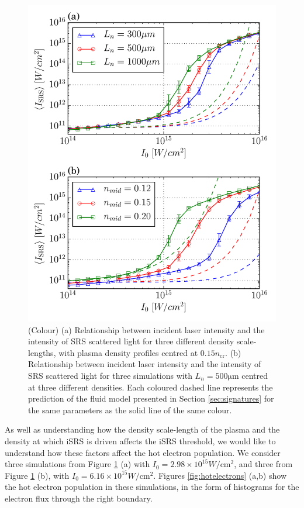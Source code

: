 \begin{figure}[!ht]
     \centering
    \includegraphics[width=0.75\columnwidth]{Chapters/C4_iSRS/fig6_6a_6b.pdf}
    \caption{
    (Colour) (a)  Relationship between incident laser intensity and the intensity of SRS scattered light for three different density scale-lengths, with plasma density profiles centred at $0.15n_\mathrm{cr}$.
    (b) Relationship between incident laser intensity and the intensity of SRS scattered light for three simulations with $L_n=500\si{\micro\metre}$ centred at three different densities.
    Each coloured dashed line represents the prediction of the fluid model presented in Section \ref{sec:signatures} for the same parameters as the solid line of the same colour.
    }
    \label{fig:paramScan}
\end{figure}


As well as understanding how the density scale-length of the plasma and the
density at which iSRS is driven affects the iSRS threshold, we would like to
understand how these factors affect the hot electron
population. We consider three simulations from Figure \ref{fig:paramScan} (a)
with $I_0 = 2.98\times 10^{15} \si{W / \centi \metre^2}$, and three from Figure
\ref{fig:paramScan} (b), with $I_0 = 6.16\times 10^{15} \si{W / \centi
\metre^2}$. Figures \ref{fig:hotelectrons} (a,b) show the hot electron
population in these simulations, in the form of histograms for the electron
flux through the right boundary.

